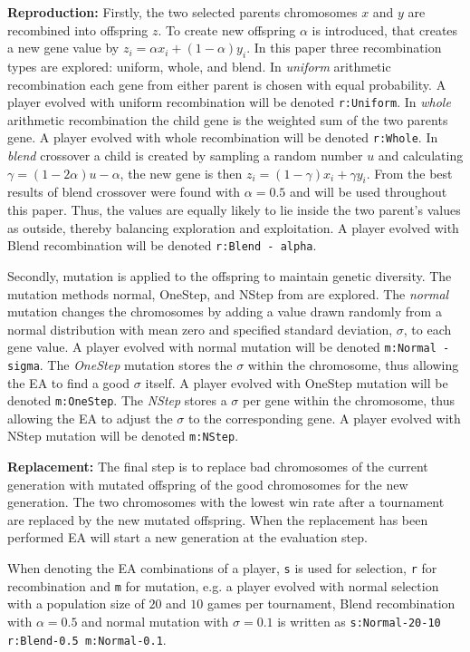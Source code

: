 \documentclass{llncs}
\begin{document}
\textbf{Reproduction:} Firstly, the two selected parents chromosomes $x$ and $y$ are recombined into offspring $z$. To create new offspring $\alpha$ is introduced, that creates a new gene value by $z_i = \alpha x_i + (1-\alpha) y_i$. In this paper three recombination types are explored: uniform, whole, and blend. In \textit{uniform} arithmetic recombination each gene from either parent is chosen with equal probability. A player evolved with uniform recombination will be denoted \texttt{r:Uniform}. In \textit{whole} arithmetic recombination the child gene is the weighted sum of the two parents gene. A player evolved with whole recombination will be denoted \texttt{r:Whole}. In \textit{blend} crossover a child is created by sampling a random number $u$ and calculating $\gamma = (1 - 2 \alpha)u - \alpha$, the new gene is then $z_i = (1-\gamma) x_i + \gamma y_i$. From \cite{ec:springer} the best results of blend crossover were found with $\alpha=0.5$ and will be used throughout this paper. Thus, the values are equally likely to lie inside the two parent's values as outside, thereby balancing exploration and exploitation. A player evolved with Blend recombination will be denoted \texttt{r:Blend - alpha}.

Secondly, mutation is applied to the offspring to maintain genetic diversity. The mutation methods normal, OneStep, and NStep from \cite{ec:springer} are explored. The \textit{normal} mutation changes the chromosomes by adding a value drawn randomly from a normal distribution with mean zero and specified standard deviation, $\sigma$, to each gene value. A player evolved with normal mutation will be denoted \texttt{m:Normal - sigma}. The \textit{OneStep} mutation stores the $\sigma$ within the chromosome, thus allowing the EA to find a good $\sigma$ itself. A player evolved with OneStep mutation will be denoted \texttt{m:OneStep}. The \textit{NStep} stores a $\sigma$ per gene within the chromosome, thus allowing the EA to adjust the $\sigma$ to the corresponding gene. A player evolved with NStep mutation will be denoted \texttt{m:NStep}.

\textbf{Replacement:} The final step is to replace bad chromosomes of the current generation with mutated offspring of the good chromosomes for the new generation. The two chromosomes with the lowest win rate after a tournament are replaced by the new mutated offspring. When the replacement has been performed EA will start a new generation at the evaluation step.

When denoting the EA combinations of a player, \texttt{s} is used for selection, \texttt{r} for recombination and \texttt{m} for mutation, e.g. a player evolved with normal selection with a population size of $20$ and $10$ games per tournament, Blend recombination with $\alpha=0.5$ and normal mutation with $\sigma=0.1$ is written as \texttt{s:Normal-20-10 r:Blend-0.5 m:Normal-0.1}.
\end{document}
